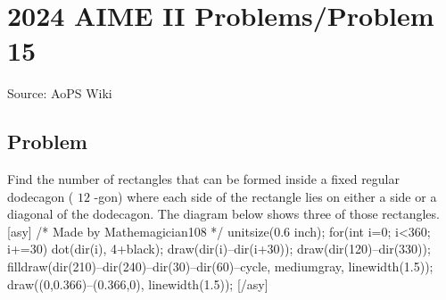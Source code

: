\documentclass[12pt]{article}
\begin{document}
\section*{{2024 AIME II Problems/Problem 15}}
Source: AoPS Wiki

\subsection*{Problem}
Find the number of rectangles that can be formed inside a fixed regular dodecagon ( $12$ -gon) where each side of the rectangle lies on either a side or a diagonal of the dodecagon. The diagram below shows three of those rectangles. [asy] /* Made by Mathemagician108 */ unitsize(0.6 inch); for(int i=0; i<360; i+=30) { dot(dir(i), 4+black); draw(dir(i)--dir(i+30)); } draw(dir(120)--dir(330)); filldraw(dir(210)--dir(240)--dir(30)--dir(60)--cycle, mediumgray, linewidth(1.5)); draw((0,0.366)--(0.366,0), linewidth(1.5)); [/asy]
\end{document}
